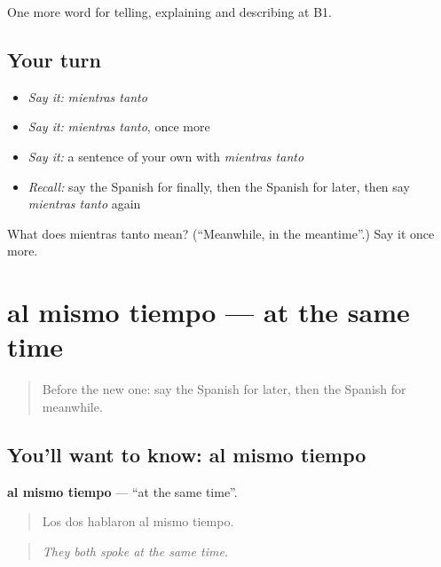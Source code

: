 \begin{grammarlens}[title={What you've built}]
One more word for telling, explaining and describing at B1.
\end{grammarlens}

\subsection*{Your turn}
\begin{itemize}
\raggedright
  \item \emph{Say it:} \emph{mientras tanto}
  \item \emph{Say it:} \emph{mientras tanto}, once more
  \item \emph{Say it:} a sentence of your own with \emph{mientras tanto}
  \item \emph{Recall:} say the Spanish for finally, then the Spanish for later, then say \emph{mientras tanto} again
\end{itemize}

\begin{tcolorbox}[breakable,colback=teal!4,colframe=teal!35!black,title={Before you move on}]
What does mientras tanto mean? (\textquotedblleft{}Meanwhile, in the meantime\textquotedblright{}.) Say it once more.
\end{tcolorbox}
\section[al mismo tiempo]{al mismo tiempo — at the same time}

\label{lesson:ES-C536-al-mismo-tiempo}



\begin{quote}
Before the new one: say the Spanish for later, then the Spanish for meanwhile.
\end{quote}

\subsection*{You'll want to know: al mismo tiempo}
\textbf{al mismo tiempo} — \textquotedblleft{}at the same time\textquotedblright{}.

\begin{quote}
Los dos hablaron al mismo tiempo.
\end{quote}

\begin{quote}
\emph{They both spoke at the same time.}
\end{quote}

